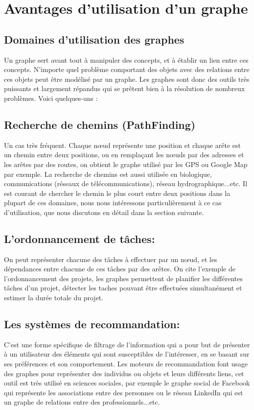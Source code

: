 	
	
\section{Avantages d'utilisation d'un graphe}
\subsection{Domaines d'utilisation des graphes}
Un graphe sert avant tout à manipuler des concepts, et à établir un lien entre ces concepts. N'importe quel problème comportant des objets avec des relations entre ces objets peut être modélisé par un graphe.
Les graphes sont donc des outils très puissants et largement répandus qui se prêtent bien à la résolution de nombreux problèmes. Voici quelques-uns :

\subsection{Recherche de chemins (PathFinding)}
Un cas très fréquent. Chaque nœud représente une position et chaque arête est un chemin entre deux positions, ou en remplaçant les nœuds par des adresses et les arêtes par des routes, on obtient le graphe utilisé par les GPS ou Google Map par exemple.
La recherche de chemins est aussi utilisée en biologique, communications (réseaux de télécommunications), réseau hydrographique...etc.
Il est courant de chercher le chemin le plus court entre deux positions dans la plupart de ces domaines, nous nous intéressons particulièrement à ce cas d'utilisation, que nous discutons en détail dans la section suivante.


\subsection{L'ordonnancement de tâches:}
On peut représenter chacune des tâches à effectuer par un nœud, et les dépendances entre chacune de ces tâches par des arêtes.
On cite l'exemple de l'ordonnancement des projets, les graphes permettent de planifier les différentes tâches d'un projet, détecter les taches pouvant être effectuées simultanément et estimer la durée totale du projet.

\subsection{Les systèmes de recommandation:}
C'est une forme spécifique de filtrage de l'information qui a pour but de présenter à un utilisateur des éléments qui sont susceptibles de l'intéresser, en se basant sur ses préférences et son comportement.
Les moteurs de recommandation font usage des graphes pour représenter des individus ou objets et leurs différents liens, cet outil est très utilisé en sciences sociales, par exemple le graphe social de Facebook qui représente les associations entre des personnes ou le réseau LinkedIn qui est un graphe de relations entre des professionnels...etc.

